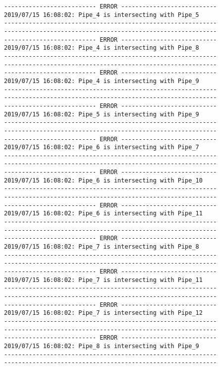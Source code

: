 \documentclass{article}
\begin{document}
{\begin{verbatim}
-------------------------- ERROR ---------------------------
2019/07/15 16:08:02: Pipe_4 is intersecting with Pipe_5
------------------------------------------------------------
------------------------------------------------------------
-------------------------- ERROR ---------------------------
2019/07/15 16:08:02: Pipe_4 is intersecting with Pipe_8
------------------------------------------------------------
------------------------------------------------------------
-------------------------- ERROR ---------------------------
2019/07/15 16:08:02: Pipe_4 is intersecting with Pipe_9
------------------------------------------------------------
------------------------------------------------------------
-------------------------- ERROR ---------------------------
2019/07/15 16:08:02: Pipe_5 is intersecting with Pipe_9
------------------------------------------------------------
------------------------------------------------------------
-------------------------- ERROR ---------------------------
2019/07/15 16:08:02: Pipe_6 is intersecting with Pipe_7
------------------------------------------------------------
------------------------------------------------------------
-------------------------- ERROR ---------------------------
2019/07/15 16:08:02: Pipe_6 is intersecting with Pipe_10
------------------------------------------------------------
------------------------------------------------------------
-------------------------- ERROR ---------------------------
2019/07/15 16:08:02: Pipe_6 is intersecting with Pipe_11
------------------------------------------------------------
------------------------------------------------------------
-------------------------- ERROR ---------------------------
2019/07/15 16:08:02: Pipe_7 is intersecting with Pipe_8
------------------------------------------------------------
------------------------------------------------------------
-------------------------- ERROR ---------------------------
2019/07/15 16:08:02: Pipe_7 is intersecting with Pipe_11
------------------------------------------------------------
------------------------------------------------------------
-------------------------- ERROR ---------------------------
2019/07/15 16:08:02: Pipe_7 is intersecting with Pipe_12
------------------------------------------------------------
------------------------------------------------------------
-------------------------- ERROR ---------------------------
2019/07/15 16:08:02: Pipe_8 is intersecting with Pipe_9
------------------------------------------------------------
------------------------------------------------------------

\end{verbatim}}
\end{document}
